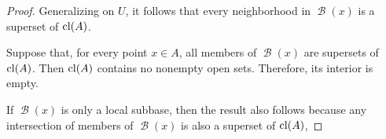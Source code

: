 \begin{proof}
  Generalizing on \( U \), it follows that every neighborhood in \( \mscrB(x) \) is a superset of \( \operatorname{cl}(A) \).

  \NecessitySubProof* Suppose that, for every point \( x \in A \), all members of \( \mscrB(x) \) are supersets of \( \operatorname{cl}(A) \). Then \( \operatorname{cl}(A) \) contains no nonempty open sets. Therefore, its interior is empty.

  If \( \mscrB(x) \) is only a local subbase, then the result also follows because any intersection of members of \( \mscrB(x) \) is also a superset of \( \operatorname{cl}(A) \),
\end{proof}
